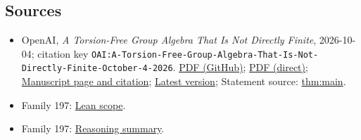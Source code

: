 \documentclass[11pt]{article}
\begin{document}
\subsection{Sources}
\begin{itemize}
\item OpenAI, \emph{A Torsion-Free Group Algebra That Is Not Directly Finite}, 2026-10-04; citation key \texttt{OAI:A-Torsion-Free-Group-Algebra-That-Is-Not-Directly-Finite-October-4-2026}. \href{https://github.com/openai/math/blob/adc7f1241b42e322a6451854ab7e4b4c146bf78a/preprints/A-Torsion-Free-Group-Algebra-That-Is-Not-Directly-Finite-October-4-2026/direct-finiteness.pdf}{PDF (GitHub)}; \href{https://github.com/openai/math/raw/adc7f1241b42e322a6451854ab7e4b4c146bf78a/preprints/A-Torsion-Free-Group-Algebra-That-Is-Not-Directly-Finite-October-4-2026/direct-finiteness.pdf}{PDF (direct)}; \href{https://github.com/openai/math/blob/adc7f1241b42e322a6451854ab7e4b4c146bf78a/preprints/A-Torsion-Free-Group-Algebra-That-Is-Not-Directly-Finite-October-4-2026/README.md}{Manuscript page and citation}; \href{https://github.com/openai/math/blob/main/preprints/A-Torsion-Free-Group-Algebra-That-Is-Not-Directly-Finite-October-4-2026/direct-finiteness.pdf}{Latest version}; Statement source: \href{https://github.com/openai/math/blob/adc7f1241b42e322a6451854ab7e4b4c146bf78a/preprints/A-Torsion-Free-Group-Algebra-That-Is-Not-Directly-Finite-October-4-2026/build/sections/introduction.tex\#L13}{thm:main}.
\item Family 197: \href{https://github.com/openai/math/blob/adc7f1241b42e322a6451854ab7e4b4c146bf78a/lean/docs/197.md}{Lean scope}.
\item Family 197: \href{https://github.com/openai/math/blob/adc7f1241b42e322a6451854ab7e4b4c146bf78a/reasoning\_traces/kaplansky-direct-finiteness-characteristic-two.pdf}{Reasoning summary}.

\end{itemize}
\end{document}
